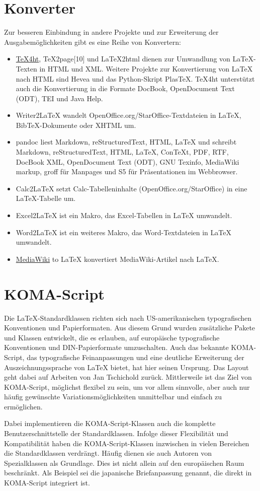 \section{Konverter}
Zur besseren Einbindung in andere Projekte und zur Erweiterung der Ausgabemöglichkeiten gibt es eine Reihe von Konvertern:
\begin{itemize}
	\item \href{https://de.wikipedia.org/wiki/TeX4ht}{TeX4ht}, TeX2page[10] und LaTeX2html dienen zur Umwandlung von LaTeX-Texten in HTML und XML. Weitere Projekte zur Konvertierung von LaTeX nach HTML sind Hevea und das Python-Skript PlasTeX. TeX4ht unterstützt auch die Konvertierung in die Formate DocBook, OpenDocument Text (ODT), TEI und Java Help.
	\item Writer2LaTeX wandelt OpenOffice.org/StarOffice-Textdateien in LaTeX, BibTeX-Dokumente oder XHTML um.
	\item pandoc liest Markdown, reStructuredText, HTML, LaTeX und schreibt Markdown, reStructuredText, HTML, LaTeX, ConTeXt, PDF, RTF, DocBook XML, OpenDocument Text (ODT), GNU Texinfo, MediaWiki markup, groff für Manpages und S5 für Präsentationen im Webbrowser.\cite{pandoc}
	\item Calc2LaTeX setzt Calc-Tabelleninhalte (OpenOffice.org/StarOffice) in eine LaTeX-Tabelle um.
	\item Excel2LaTeX ist ein Makro, das Excel-Tabellen in LaTeX umwandelt.
	\item Word2LaTeX ist ein weiteres Makro, das Word-Textdateien in LaTeX umwandelt.
	\item \href{http://sourceforge.net/p/wb2pdf/git/ci/master/tree/}{MediaWiki} to LaTeX konvertiert MediaWiki-Artikel nach LaTeX.
\end{itemize}

\section{KOMA-Script}
Die LaTeX-Standardklassen richten sich nach US-amerikanischen typografischen Konventionen und Papierformaten. Aus diesem Grund wurden zusätzliche Pakete und Klassen entwickelt, die es erlauben, auf europäische typografische Konventionen und DIN-Papierformate umzuschalten. Auch das bekannte KOMA-Script, das typografische Feinanpassungen und eine deutliche Erweiterung der Auszeichnungssprache von LaTeX bietet, hat hier seinen Ursprung. Das Layout geht dabei auf Arbeiten von Jan Tschichold zurück. Mittlerweile ist das Ziel von KOMA-Script, möglichst flexibel zu sein, um vor allem sinnvolle, aber auch nur häufig gewünschte Variationsmöglichkeiten unmittelbar und einfach zu ermöglichen.

Dabei implementieren die KOMA-Script-Klassen auch die komplette Benutzerschnittstelle der Standardklassen. Infolge dieser Flexibilität und Kompatibilität haben die KOMA-Script-Klassen inzwischen in vielen Bereichen die Standardklassen verdrängt. Häufig dienen sie auch Autoren von Spezialklassen als Grundlage. Dies ist nicht allein auf den europäischen Raum beschränkt. Als Beispiel sei die japanische Briefanpassung genannt, die direkt in KOMA-Script integriert ist.